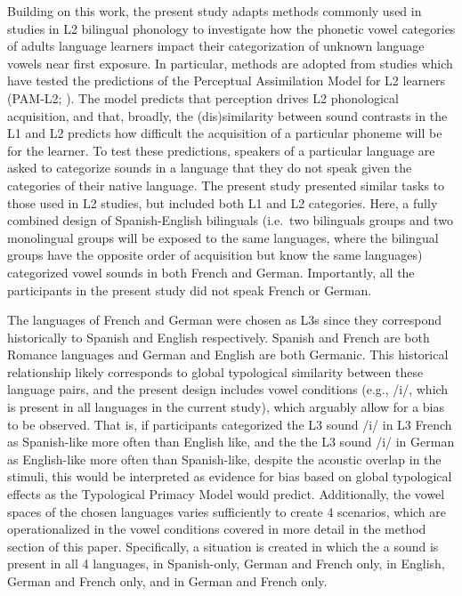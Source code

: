 \documentclass[preprints]{Definitions/mdpi}
\begin{document}
Building on this work, the present study adapts methods commonly used in studies in L2 bilingual phonology to investigate how the phonetic vowel categories of adults language learners impact their categorization of unknown language vowels near first exposure.
In particular, methods are adopted from studies which have tested the predictions of the Perceptual Assimilation Model for L2 learners (PAM-L2; \citeauthor{bohn_nonnative_2007} \citeyear{bohn_nonnative_2007}).
The model predicts that perception drives L2 phonological acquisition, and that, broadly, the (dis)similarity between sound contrasts in the L1 and L2 predicts how difficult the acquisition of a particular phoneme will be for the learner.
To test these predictions, speakers of a particular language are asked to categorize sounds in a language that they do not speak given the categories of their native language.
The present study presented similar tasks to those used in L2 studies, but included both L1 and L2 categories.
Here, a fully combined design of Spanish-English bilinguals (i.e.~two bilinguals groups and two monolingual groups will be exposed to the same languages, where the bilingual groups have the opposite order of acquisition but know the same languages) categorized vowel sounds in both French and German.
Importantly, all the participants in the present study did not speak French or German.

The languages of French and German were chosen as L3s since they correspond historically to Spanish and English respectively.
Spanish and French are both Romance languages and German and English are both Germanic.
This historical relationship likely corresponds to global typological similarity between these language pairs, and the present design includes vowel conditions (e.g., /i/, which is present in all languages in the current study), which arguably allow for a bias to be observed.
That is, if participants categorized the L3 sound /i/ in L3 French as Spanish-like more often than English like, and the the L3 sound /i/ in German as English-like more often than Spanish-like, despite the acoustic overlap in the stimuli, this would be interpreted as evidence for bias based on global typological effects as the Typological Primacy Model would predict.
Additionally, the vowel spaces of the chosen languages varies sufficiently to create 4 scenarios, which are operationalized in the vowel conditions covered in more detail in the method section of this paper.
Specifically, a situation is created in which the a sound is present in all 4 languages, in Spanish-only, German and French only, in English, German and French only, and in German and French only.
\end{document}
